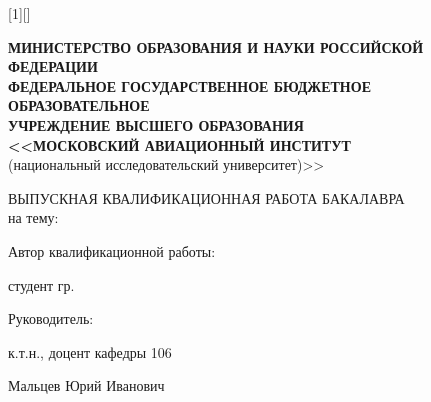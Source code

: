[1][]
{
\vspace{-9ex}
\begin{center}
\begin{minipage}{0.05\textwidth}
    \resizebox{1.3cm}{!}{}
\end{minipage}
\hfill
\begin{minipage}{0.93\textwidth}
\begin{center}
\tiny{
    \textbf{МИНИСТЕРСТВО ОБРАЗОВАНИЯ И НАУКИ РОССИЙСКОЙ ФЕДЕРАЦИИ}\\
    \textbf{ФЕДЕРАЛЬНОЕ ГОСУДАРСТВЕННОЕ БЮДЖЕТНОЕ ОБРАЗОВАТЕЛЬНОЕ\\
        УЧРЕЖДЕНИЕ ВЫСШЕГО ОБРАЗОВАНИЯ\\
    <<МОСКОВСКИЙ АВИАЦИОННЫЙ ИНСТИТУТ}\\ 
(национальный исследовательский университет)>>}

\end{center}
\end{minipage}
\vspace{5ex}

\footnotesize{ВЫПУСКНАЯ КВАЛИФИКАЦИОННАЯ РАБОТА БАКАЛАВРА\\ на тему:}\par
\small{\inserttitle}\par
\vspace{10ex}
\begin{minipage}{0.9\textwidth}
\hfill \scriptsize{Автор квалификационной работы: }\par
\hfill \scriptsize{студент гр.\insertinstitute}\par
\hfill \scriptsize{\insertauthor}\par
\hfill \scriptsize{Руководитель: }\par
\hfill \scriptsize{к.т.н., доцент кафедры 106}\par
\hfill \scriptsize{Мальцев Юрий Иванович}\par
\end{minipage}


\insertdate\par
{}\inserttitlegraphic
\end{center}
}


